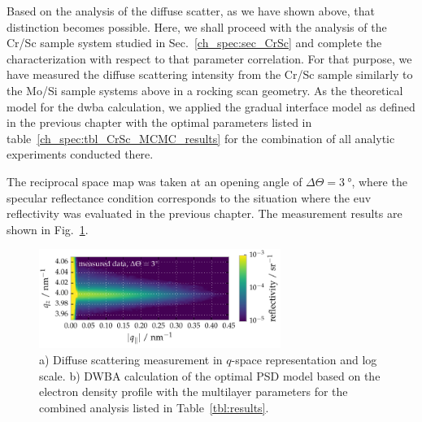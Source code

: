 Based on the analysis of the diffuse scatter, as we have shown above, that distinction becomes possible. Here, we shall proceed with the analysis of the Cr/Sc sample system studied in Sec.~\ref{ch_spec:sec_CrSc} and complete the characterization with respect to that parameter correlation. For that purpose, we have measured the diffuse scattering intensity from the Cr/Sc sample similarly to the Mo/Si sample systems above in a rocking scan geometry. As the theoretical model for the \gls{dwba} calculation, we applied the gradual interface model as defined in the previous chapter with the optimal parameters listed in table~\ref{ch_spec:tbl_CrSc_MCMC_results} for the combination of all analytic experiments conducted there.

The reciprocal space map was taken at an opening angle of $\Delta \Theta = \SI{3}{\degree}$, where the specular reflectance condition corresponds to the situation where the \gls{euv} reflectivity was evaluated in the previous chapter. The measurement results are shown in Fig.~\ref{ch_diff:fig_CrSc_diffuse_meas}.
\begin{figure}[htbp]
  \centering
  \includegraphics[width=0.7\textwidth]{img/CrSc_diffuse_measured}
  \caption{a) Diffuse scattering measurement in $q$-space representation and 
log scale. b) DWBA calculation of the optimal PSD model based on the electron 
density profile with the multilayer parameters for the combined analysis listed 
in Table~\ref{tbl:results}.}
  \label{ch_diff:fig_CrSc_diffuse_meas}
\end{figure}
